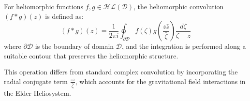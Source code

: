 \begin{definition}
For heliomorphic functions $f, g \in \mathcal{HL}(\mathcal{D})$, the heliomorphic convolution $(f * g)(z)$ is defined as:
\begin{equation}
(f * g)(z) = \frac{1}{2\pi i} \oint_{\partial \mathcal{D}} f(\zeta) g\left(\frac{z\bar{z}}{\bar{\zeta}}\right) \frac{d\zeta}{\zeta - z}
\end{equation}
where $\partial \mathcal{D}$ is the boundary of domain $\mathcal{D}$, and the integration is performed along a suitable contour that preserves the heliomorphic structure.

This operation differs from standard complex convolution by incorporating the radial conjugate term $\frac{z\bar{z}}{\bar{\zeta}}$, which accounts for the gravitational field interactions in the Elder Heliosystem.
\end{definition}

